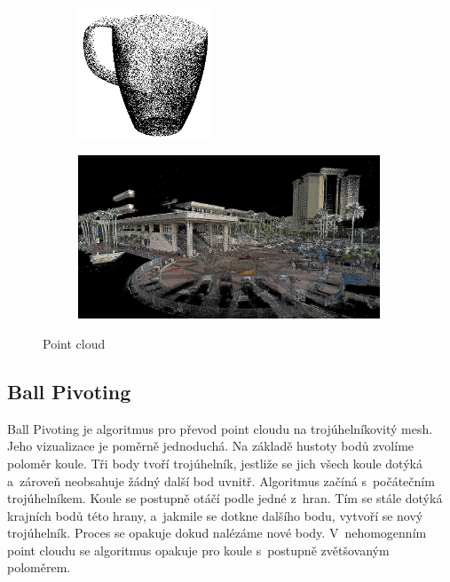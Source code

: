 \documentclass[12pt]{report}			%
\begin{document}
                \begin{figure}[h]
                    \centering
                    \begin{subfigure}{4cm}
                        \centering
                        \includegraphics[width=4cm]{images/pointcloud.png}
                    \end{subfigure}
                    \hfill
                    \begin{subfigure}{9cm}
                        \centering
                        \includegraphics[width=9cm]{images/pointcloudcolor.jpg}
                    \end{subfigure}
                    \caption{Point cloud}
                \end{figure}

                \subsection{Ball Pivoting}

                    Ball Pivoting je algoritmus pro převod point cloudu na trojúhelníkovitý mesh. Jeho vizualizace je poměrně jednoduchá. Na základě hustoty bodů zvolíme poloměr koule. Tři body tvoří trojúhelník, jestliže se jich všech koule dotýká a~zároveň neobsahuje žádný další bod uvnitř. Algoritmus začíná s~počátečním trojúhelníkem. Koule se postupně otáčí podle jedné z~hran. Tím se stále dotýká krajních bodů této hrany, a~jakmile se dotkne dalšího bodu, vytvoří se nový trojúhelník. Proces se opakuje dokud nalézáme nové body. V~nehomogenním point cloudu se algoritmus opakuje pro koule s~postupně zvětšovaným poloměrem. \cite{ballpivot}
\end{document}
